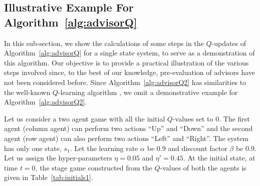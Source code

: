 \documentclass[jair, twoside,11pt,theapa]{article}
\begin{document}




\subsection{Illustrative Example For Algorithm~\ref{alg:advisorQ}}\label{sec:algorithmexample}


In this sub-section, we show the calculations of some steps in the $Q$-updates of Algorithm~\ref{alg:advisorQ} for a single state system, to serve as a demonstration of this algorithm. Our objective is to provide a practical illustration of the various steps involved since, to the best of our knowledge, pre-evaluation of advisors have not been considered before. Since Algorithm~\ref{alg:advisorQ2} has similarities to the well-known $Q$-learning algorithm \citep{watkins1992q}, we omit a demonstrative example for Algorithm~\ref{alg:advisorQ2}.

Let us consider a two agent game with all the initial $Q$-values set to 0. The first agent (column agent) can perform two actions ``Up'' and ``Down'' and the second agent (row agent) can also perform two actions ``Left'' and ``Right''. The system has only one state, $s_1$. Let the learning rate $\alpha$ be 0.9 and discount factor $\beta$ be 0.9. Let us assign the hyper-parameters $\eta = 0.05$ and $\eta' = 0.45$. At the initial state, at time $t=0$, the stage game constructed from the $Q$-values of both the agents is given in Table~\ref{tab:initials1}. 
\end{document}
